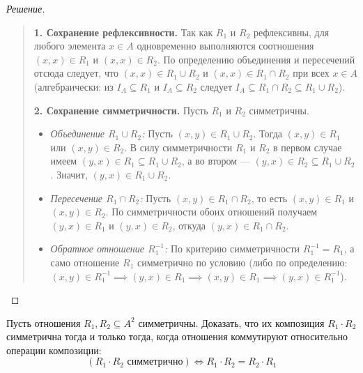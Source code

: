 \begin{proof}[Решение]~\\
    \begin{quote}
        \textbf{1. Сохранение рефлексивности.} 
        Так как $R_1$ и $R_2$ рефлексивны, для любого элемента $x \in A$ 
        одновременно выполняются соотношения $(x, x) \in R_1$ и 
        $(x, x) \in R_2$. По определению объединения и пересечений отсюда 
        следует, что $(x, x) \in R_1 \cup R_2$ и $(x, x) \in R_1 \cap R_2$ 
        при всех $x \in A$ (алгебраически: из $I_A \subseteq R_1$ и 
        $I_A \subseteq R_2$ следует $I_A \subseteq R_1 \cap R_2 \subseteq 
        R_1 \cup R_2$).

        \textbf{2. Сохранение симметричности.} 
        Пусть $R_1$ и $R_2$ симметричны.
        \begin{itemize}
            \item \emph{Объединение $R_1 \cup R_2$:} Пусть 
            $(x, y) \in R_1 \cup R_2$. Тогда $(x, y) \in R_1$ или 
            $(x, y) \in R_2$. В силу симметричности $R_1$ и $R_2$ в первом 
            случае имеем $(y, x) \in R_1 \subseteq R_1 \cup R_2$, а во 
            втором --- $(y, x) \in R_2 \subseteq R_1 \cup R_2$. Значит, 
            $(y, x) \in R_1 \cup R_2$.
            \item \emph{Пересечение $R_1 \cap R_2$:} Пусть 
            $(x, y) \in R_1 \cap R_2$, то есть $(x, y) \in R_1$ и 
            $(x, y) \in R_2$. По симметричности обоих отношений получаем 
            $(y, x) \in R_1$ и $(y, x) \in R_2$, откуда 
            $(y, x) \in R_1 \cap R_2$.
            \item \emph{Обратное отношение $R_1^{-1}$:} По критерию 
            симметричности $R_1^{-1} = R_1$, а само отношение $R_1$ 
            симметрично по условию (либо по определению: 
            $(x, y) \in R_1^{-1} \implies (y, x) \in R_1 \implies 
            (x, y) \in R_1 \implies (y, x) \in R_1^{-1}$).
        \end{itemize}
    \end{quote}
\end{proof}

\begin{problem}
    Пусть отношения $R_1, R_2 \subseteq A^2$ симметричны. Доказать, что их 
    композиция $R_1 \cdot R_2$ симметрична тогда и только тогда, когда 
    отношения коммутируют относительно операции композиции:
    \begin{equation} \label{eq:sym_comp_crit}
        (R_1 \cdot R_2 \text{ симметрично}) \iff R_1 \cdot R_2 = R_2 \cdot R_1 
        \tag{10}
    \end{equation}
\end{problem}

